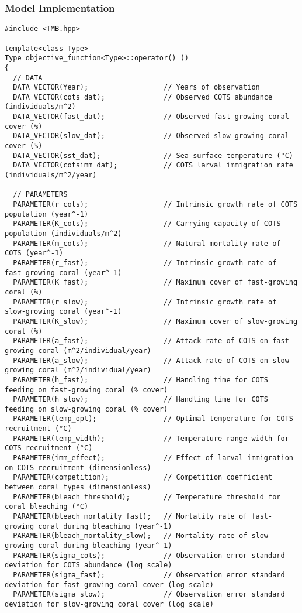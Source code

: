 \subsubsection{Model Implementation}
\begin{lstlisting}
#include <TMB.hpp>

template<class Type>
Type objective_function<Type>::operator() ()
{
  // DATA
  DATA_VECTOR(Year);                  // Years of observation
  DATA_VECTOR(cots_dat);              // Observed COTS abundance (individuals/m^2)
  DATA_VECTOR(fast_dat);              // Observed fast-growing coral cover (%)
  DATA_VECTOR(slow_dat);              // Observed slow-growing coral cover (%)
  DATA_VECTOR(sst_dat);               // Sea surface temperature (°C)
  DATA_VECTOR(cotsimm_dat);           // COTS larval immigration rate (individuals/m^2/year)
  
  // PARAMETERS
  PARAMETER(r_cots);                  // Intrinsic growth rate of COTS population (year^-1)
  PARAMETER(K_cots);                  // Carrying capacity of COTS population (individuals/m^2)
  PARAMETER(m_cots);                  // Natural mortality rate of COTS (year^-1)
  PARAMETER(r_fast);                  // Intrinsic growth rate of fast-growing coral (year^-1)
  PARAMETER(K_fast);                  // Maximum cover of fast-growing coral (%)
  PARAMETER(r_slow);                  // Intrinsic growth rate of slow-growing coral (year^-1)
  PARAMETER(K_slow);                  // Maximum cover of slow-growing coral (%)
  PARAMETER(a_fast);                  // Attack rate of COTS on fast-growing coral (m^2/individual/year)
  PARAMETER(a_slow);                  // Attack rate of COTS on slow-growing coral (m^2/individual/year)
  PARAMETER(h_fast);                  // Handling time for COTS feeding on fast-growing coral (% cover)
  PARAMETER(h_slow);                  // Handling time for COTS feeding on slow-growing coral (% cover)
  PARAMETER(temp_opt);                // Optimal temperature for COTS recruitment (°C)
  PARAMETER(temp_width);              // Temperature range width for COTS recruitment (°C)
  PARAMETER(imm_effect);              // Effect of larval immigration on COTS recruitment (dimensionless)
  PARAMETER(competition);             // Competition coefficient between coral types (dimensionless)
  PARAMETER(bleach_threshold);        // Temperature threshold for coral bleaching (°C)
  PARAMETER(bleach_mortality_fast);   // Mortality rate of fast-growing coral during bleaching (year^-1)
  PARAMETER(bleach_mortality_slow);   // Mortality rate of slow-growing coral during bleaching (year^-1)
  PARAMETER(sigma_cots);              // Observation error standard deviation for COTS abundance (log scale)
  PARAMETER(sigma_fast);              // Observation error standard deviation for fast-growing coral cover (log scale)
  PARAMETER(sigma_slow);              // Observation error standard deviation for slow-growing coral cover (log scale)
  

\end{lstlisting}
